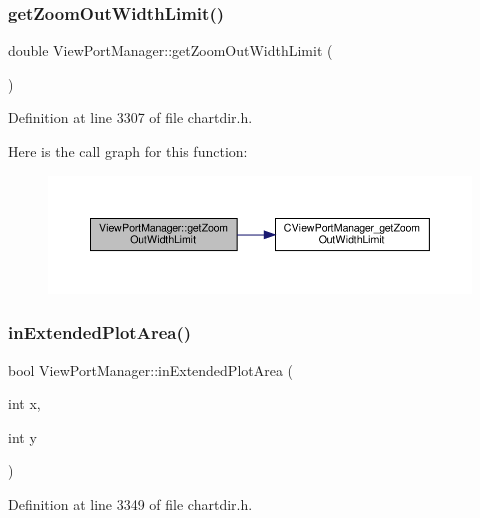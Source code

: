 \subsubsection{\texorpdfstring{get\+Zoom\+Out\+Width\+Limit()}{getZoomOutWidthLimit()}}
{\footnotesize\ttfamily double View\+Port\+Manager\+::get\+Zoom\+Out\+Width\+Limit (\begin{DoxyParamCaption}{ }\end{DoxyParamCaption})\hspace{0.3cm}{\ttfamily [inline]}}



Definition at line 3307 of file chartdir.\+h.

Here is the call graph for this function\+:
\nopagebreak
\begin{figure}[H]
\begin{center}
\leavevmode
\includegraphics[width=350pt]{class_view_port_manager_ac9cb2aed6dfbe6dcf2049e8ccf1b8b47_cgraph}
\end{center}
\end{figure}
\mbox{\label{class_view_port_manager_a11b9ed53c57b96be9ef663200b64be87}} 
\subsubsection{\texorpdfstring{in\+Extended\+Plot\+Area()}{inExtendedPlotArea()}}
{\footnotesize\ttfamily bool View\+Port\+Manager\+::in\+Extended\+Plot\+Area (\begin{DoxyParamCaption}\item[{int}]{x,  }\item[{int}]{y }\end{DoxyParamCaption})\hspace{0.3cm}{\ttfamily [inline]}}



Definition at line 3349 of file chartdir.\+h.

